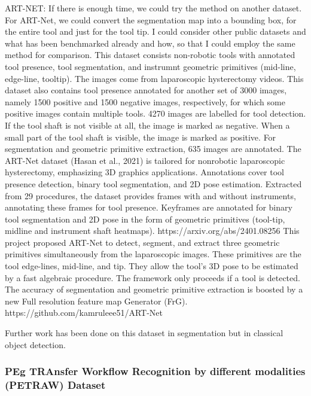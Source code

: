 ART-NET: If there is enough time, we could try the method on another dataset. For ART-Net, we could convert the segmentation map into a bounding box, for the entire tool and just for the tool tip. I could consider other public datasets and what has been benchmarked already and how, so that I could employ the same method for comparison.
This dataset consists non-robotic tools with annotated tool presence, tool segmentation, and instrumnt geometric primitives (mid-line, edge-line, tooltip). The images come from laparoscopic hysterectomy videos. This dataset also contains tool presence annotated for another set of 3000 images, namely 1500 positive and 1500 negative images, respectively, for which some positive images contain multiple tools. 4270 images are labelled for tool detection. If the tool shaft is not visible at all, the image is marked as negative. When a small part of the tool shaft is visible, the image is marked as positive. For segmentation and geometric primitive extraction, 635 images are annotated.
The ART-Net dataset (Hasan et al., 2021) is tailored for nonrobotic laparoscopic hysterectomy, emphasizing 3D graphics applications. Annotations cover tool presence detection, binary tool segmentation, and 2D pose estimation. Extracted from 29 procedures, the dataset provides frames with and without instruments, annotating these frames for tool presence. Keyframes are annotated for binary tool segmentation and 2D pose in the form of geometric primitives (tool-tip, midline and instrument shaft heatmaps). https://arxiv.org/abs/2401.08256
This project proposed ART-Net to detect, segment, and extract three geometric primitives simultaneously from the laparoscopic images. These primitives are the tool edge-lines, mid-line, and tip. They allow the tool's 3D pose to be estimated by a fast algebraic procedure. The framework only proceeds if a tool is detected. The accuracy of segmentation and geometric primitive extraction is boosted by a new Full resolution feature map Generator (FrG). https://github.com/kamruleee51/ART-Net

Further work has been done on this dataset in segmentation \cite{lou_min-max_2022} but in classical object detection.


\subsubsection{PEg TRAnsfer Workflow Recognition by different modalities (PETRAW) Dataset}

